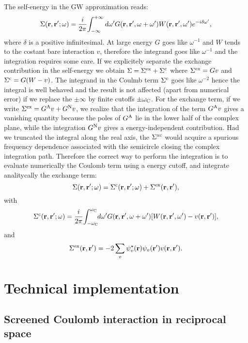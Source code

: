 \documentclass[twocolumn,prb,showpacs,superscriptaddress]{revtex4}
\def\w{\omega}
\def\wp{\omega^\prime}
\def\wc{{\omega_{\rm C}}}
\def\r{{\bf r}}
\def\rp{{\bf r^\prime}}
\begin{document}
The self-energy in the GW approximation reads:\cite{hl86}
  \begin{equation} \label{eq.sigma}
  \Sigma(\r,\rp;\w) = \frac{i}{2\pi} \! \int_{-\infty}^{+\infty} d\wp 
    G(\r,\rp,\w+\wp) W(\r,\rp,\wp) e^{-i\delta\wp},
  \end{equation}
where $\delta$ is a positive infinitesimal. 
At large energy $G$ goes like $\w^{-1}$ and $W$ tends to the costant 
bare interaction $v$, therefore the integrand goes like $\w^{-1}$
and the integration requires some care.
If we explicitely separate the exchange contribution in the self-energy we obtain
$\Sigma = \Sigma^{\rm ex} + \Sigma^{\rm c}$ where $\Sigma^{\rm ex}=Gv$
and $\Sigma^{\rm c}=G(W-v)$.\cite{pade3}
The integrand in the Coulmb term $\Sigma^{\rm c}$ goes like $\w^{-2}$ 
hence the integral is well behaved and the result is not affected
(apart from numerical error) if we replace the $\pm \infty$ by finite cutoffs $\pm \wc$.
For the exchange term, if we write $\Sigma^{\rm ex}=G^{\rm A}v + G^{\rm N}v$,
we realize that the integration of the term $G^{\rm A}v$ gives a
vanishing quantity because the poles of $G^{\rm A}$ lie in the lower half 
of the complex plane, while the integration $G^{\rm N}v$ gives a energy-independent contribution.
Had we truncated the integral along the real axis, the $\Sigma^{\rm xc}$
would acquire a spurious frequency dependence associated with
the semicircle closing the complex integration path.
Therefore the correct way to perform the integration is to evaluate numerically
the Coulomb term using a energy cutoff, and integrate analitycally the exchange term:
  \begin{equation}
  \Sigma(\r,\rp;\w) = \Sigma^{\rm c}(\r,\rp;\w) + \Sigma^{\rm ex}(\r,\rp),
  \end{equation}
with
  \begin{equation}
  \Sigma^{\rm c}(\r,\rp;\w) = \frac{i}{2\pi} \! \int_{-\wc}^\wc \!\! d\wp
    G(\r,\rp,\w+\wp) [W(\r,\rp,\wp)-v(\r,\rp)],
  \end{equation}
and
  \begin{equation}
  \Sigma^{\rm ex}(\r,\rp) = - 2 \sum_v \psi_v^\star(\r)\psi_v(\rp) v(\r,\rp).
  \end{equation}


\section{Technical implementation}

\subsection{Screened Coulomb interaction in reciprocal space}
\end{document}
